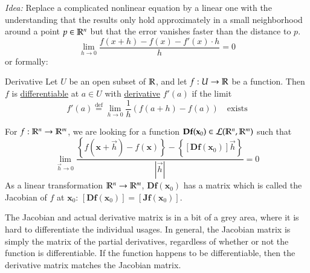 \textit{Idea:} Replace a complicated nonlinear equation by a linear one with the understanding that the results only hold approximately in a small neighborhood around a point $p\in \mathbb{R}^n$ but that the error vanishes faster than the distance to $p$.
\[\lim_{h\rightarrow 0} \frac{f(x+h)-f(x)-f'(x)\cdot h}{h}=0\]
or formally: 
\begin{defn}{Derivative}
	Let $U$ be an open subset of $\mathbb{R}$, and let $f : U\to \mathbb{R}$ be a function. Then $f$ is \ul{differentiable} at $a\in U$ with \ul{derivative} $f'(a)$ if the limit
\[f'(a)\overset{\mathrm{def}}{=}\lim_{h\rightarrow 0}\frac{1}{h}\left(f(a+h)-f(a)\right)\quad \text{exists}\]
\end{defn}
For $f : \mathbb{R}^n \rightarrow \mathbb{R}^m$, we are looking for a function $\textbf{Df}(\textbf{x}_0)\in \mathcal{L}(\mathbb{R}^n,\mathbb{R}^m)$ such that
\[\lim_{\vec{h}\rightarrow 0} \frac{\left\{f(\bm{x}+\vec{h})-f(\bm{x})\right\}-\left\{[\bm{Df}(\bm{x}_0)]\vec{h}\right\}}{|\vec{h}|}=0\]
As a linear transformation $\mathbb{R}^n\rightarrow \mathbb{R}^m$, $\bm{Df}(\bm{x}_0)$ has a matrix which is called the Jacobian of $f$ at $\bm{x}_0$: $[\bm{Df}(\bm{x}_0)]=[\bm{Jf}(\bm{x}_{0})]$. 

The Jacobian and actual derivative matrix is in a bit of a grey area, where it is hard to differentiate the individual usages. In general, the Jacobian matrix is simply the matrix of the partial derivatives, regardless of whether or not the function is differentiable. If the function happens to be differentiable, then the derivative matrix matches the Jacobian matrix. 
